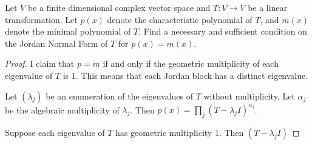 \documentclass{article}
\begin{document}
 Let $V$ be a finite dimensional complex vector space and $T:V \to V$ be a linear transformation. Let $p(x)$ denote the characteristic polynomial of $T$, and $m(x)$ denote the minimal polynomial of $T$. Find a necessary and sufficient condition on the Jordan Normal Form of $T$ for $p(x) = m(x)$.
\begin{proof}
I claim that $p = m$ if and only if the geometric multiplicity of each eigenvalue of $T$ is $1$. This means that each Jordan block has a distinct eigenvalue.

Let $(\lambda_j)$ be an enumeration of the eigenvalues of $T$ without multiplicity.  Let $\alpha_j$ be the algebraic multiplicity of $\lambda_j$.  Then $p(x) = \prod_j (T - \lambda_j I)^{\alpha_j}$.

Suppose each eigenvalue of $T$ has geometric multiplicity 1. Then $(T - \lambda_j I)$
\end{proof}
\end{document}

